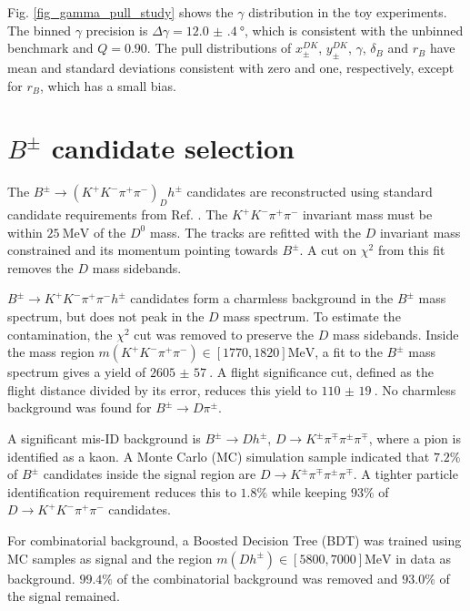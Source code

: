 \documentclass[12pt, a4paper, notitlepage, onecolumn]{article}
\begin{document}
Fig. \ref{fig_gamma_pull_study} shows the $\gamma$ distribution in the toy experiments. The binned $\gamma$ precision is $\Delta\gamma = \SI{12.0(4)}{\degree}$, which is consistent with the unbinned benchmark and $Q = 0.90$. The pull distributions of $x_\pm^{DK}$, $y_\pm^{DK}$, $\gamma$, $\delta_B$ and $r_B$ have mean and standard deviations consistent with zero and one, respectively, except for $r_B$, which has a small bias.

\section{\texorpdfstring{$B^\pm$}{B} candidate selection}
\noindent The $B^\pm\to (K^+K^-\pi^+\pi^-)_Dh^\pm$ candidates are reconstructed using standard candidate requirements from Ref. \cite{cite_LHCbGGSZKSpipi}. The $K^+K^-\pi^+\pi^-$ invariant mass must be within $\SI{25}{\mega\eV}$ of the $D^0$ mass. The tracks are refitted with the $D$ invariant mass constrained and its momentum pointing towards $B^\pm$. A cut on $\chi^2$ from this fit removes the $D$ mass sidebands.

$B^\pm\to K^+K^-\pi^+\pi^-h^\pm$ candidates form a charmless background in the $B^\pm$ mass spectrum, but does not peak in the $D$ mass spectrum. To estimate the contamination, the $\chi^2$ cut was removed to preserve the $D$ mass sidebands. Inside the mass region $m(K^+K^-\pi^+\pi^-)\in[1770, 1820]\si{\mega\eV}$, a fit to the $B^\pm$ mass spectrum gives a yield of $\SI{2605(57)}{}$. A flight significance cut, defined as the flight distance divided by its error, reduces this yield to $\SI{110(19)}{}$. No charmless background was found for $B^\pm\to D\pi^\pm$.

A significant mis-ID background is $B^\pm\to Dh^\pm$, $D\to K^\pm\pi^\mp\pi^\pm\pi^\mp$, where a pion is identified as a kaon. A Monte Carlo (MC) simulation sample indicated that $7.2\%$ of $B^\pm$ candidates inside the signal region are $D\to K^\pm\pi^\mp\pi^\pm\pi^\mp$. A tighter particle identification requirement reduces this to $1.8\%$ while keeping $93\%$ of $D\to K^+K^-\pi^+\pi^-$ candidates.

For combinatorial background, a Boosted Decision Tree (BDT) was trained using MC samples as signal and the region $m(Dh^\pm)\in[5800, 7000]\si{\mega\eV}$ in data as background. $99.4\%$ of the combinatorial background was removed and $93.0\%$ of the signal remained.

\end{document}
